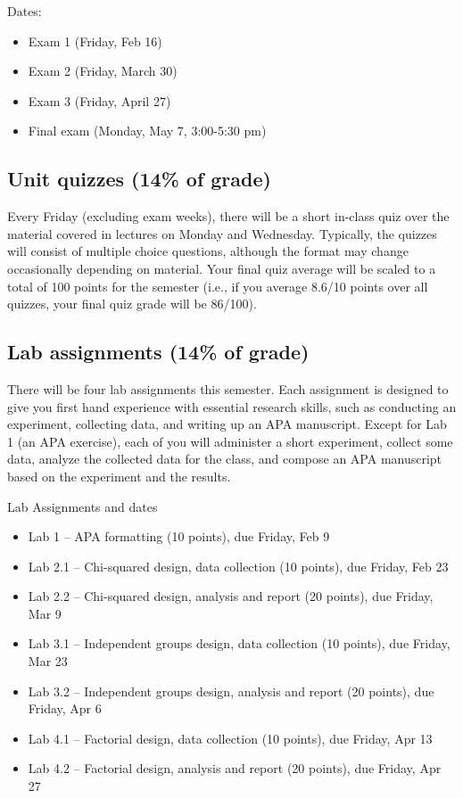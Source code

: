 \documentclass[10pt]{article}
\begin{document}
Dates:

\begin{itemize}
\item Exam 1 (Friday, Feb 16)
\item Exam 2 (Friday, March 30)
\item Exam 3 (Friday, April 27)
\item Final exam (Monday, May 7, 3:00-5:30 pm)
\end{itemize}

\subsection*{Unit quizzes (14\% of grade)}
\label{sec-5-2}

Every Friday (excluding exam weeks), there will be a short in-class quiz over the material covered in lectures on Monday and Wednesday. Typically, the quizzes will consist of multiple choice questions, although the format may change occasionally depending on material.  Your final quiz average will be scaled to a total of 100 points for the semester (i.e., if you average 8.6/10 points over all quizzes, your final quiz grade will be 86/100).

\subsection*{Lab assignments (14\% of grade)}
\label{sec-5-3}

There will be four lab assignments this semester.  Each assignment is designed to give you first hand experience with essential research skills, such as conducting an experiment, collecting data, and writing up an APA manuscript.  Except for Lab 1 (an APA exercise), each of you will administer a short experiment, collect some data, analyze the collected data for the class, and compose an APA manuscript based on the experiment and the results. 

Lab Assignments and dates

\begin{itemize}
\item Lab 1 – APA formatting (10 points), due Friday, Feb 9
\item Lab 2.1 – Chi-squared design, data collection (10 points), due Friday, Feb 23
\item Lab 2.2 – Chi-squared design, analysis and report (20 points), due Friday, Mar 9
\item Lab 3.1 – Independent groups design, data collection (10 points), due Friday, Mar 23
\item Lab 3.2 – Independent groups design, analysis and report (20 points), due Friday, Apr 6
\item Lab 4.1 – Factorial design, data collection (10 points), due Friday, Apr 13
\item Lab 4.2 – Factorial design, analysis and report (20 points), due Friday, Apr 27
\end{itemize}
\end{document}
